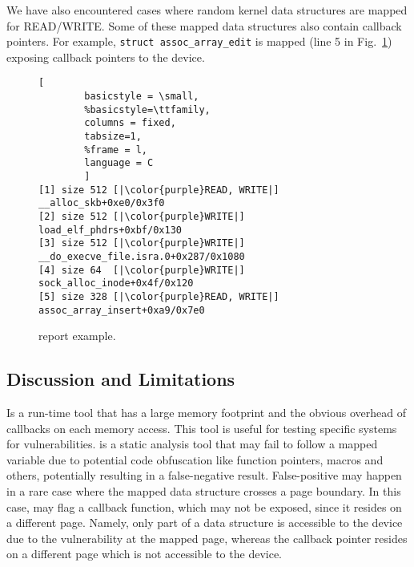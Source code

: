 We have also encountered cases where random kernel data structures are mapped for READ/WRITE. Some of these mapped data structures also contain callback pointers. For example, \texttt{struct assoc\_array\_edit} is mapped (line 5 in Fig.~\ref{fig:dkasan-report}) exposing callback pointers to the device. 
%
\begin{figure}[t]
\begin{adjustbox}{width=0.9\linewidth}
        \begin{lstlisting}[
        basicstyle = \small,
        %basicstyle=\ttfamily,
        columns = fixed,
        tabsize=1,
        %frame = l,
        language = C
        ]
[1] size 512 [|\color{purple}READ, WRITE|] __alloc_skb+0xe0/0x3f0
[2] size 512 [|\color{purple}WRITE|] load_elf_phdrs+0xbf/0x130
[3] size 512 [|\color{purple}WRITE|] __do_execve_file.isra.0+0x287/0x1080
[4] size 64  [|\color{purple}WRITE|] sock_alloc_inode+0x4f/0x120
[5] size 328 [|\color{purple}READ, WRITE|] assoc_array_insert+0xa9/0x7e0
        \end{lstlisting}
\end{adjustbox}
        \caption{\dkasan report example.}
        \label{fig:dkasan-report}
\end{figure}

\subsection{Discussion and Limitations}
\dkasan Is a run-time tool that has a large memory footprint and the obvious overhead of callbacks on each memory access. This tool is useful for testing specific systems for vulnerabilities.
\tool is a static analysis tool that may fail to follow a mapped variable due to potential code obfuscation like function pointers, macros and others, potentially resulting in a false-negative result. False-positive may happen in a rare case
where the mapped data structure crosses a  page boundary. In this case, \tool may flag a callback function, which may not be exposed, since it resides on a different page. Namely, only part of a data structure is accessible to the device due to the \subpage{} vulnerability at the mapped page, whereas the callback pointer resides on a different page which is not accessible to the device.%